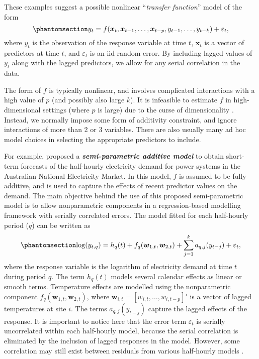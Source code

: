 \documentclass[
  11pt,
  a4paper,
]{article}
\begin{document}
These examples suggest a possible nonlinear ``\emph{transfer function}''
model of the form \begin{equation}\phantomsection\label{eq-transferfun}{
 y_t = f(\bm{x}_{t}, \bm{x}_{t-1}, \dots,\bm{x}_{t-p}, y_{t-1},\dots,y_{t-k}) + \varepsilon_{t},
}\end{equation} where \(y_{t}\) is the observation of the response
variable at time \(t\), \(\bm{x}_{t}\) is a vector of predictors at time
\(t\), and \(\varepsilon_{t}\) is an iid random error. By including
lagged values of \(y_{t}\) along with the lagged predictors, we allow
for any serial correlation in the data.

The form of \(f\) is typically nonlinear, and involves complicated
interactions with a high value of \(p\) (and possibly also large \(k\)).
It is infeasible to estimate \(f\) in high-dimensional settings (where
\(p\) is large) due to the curse of dimensionality
\autocite{Bellman57,Stone82}. Instead, we normally impose some form of
additivity constraint, and ignore interactions of more than 2 or 3
variables. There are also usually many ad hoc model choices in selecting
the appropriate predictors to include.

For example, \textcite{FH2012} proposed a \textbf{\emph{semi-parametric
additive model}} to obtain short-term forecasts of the half-hourly
electricity demand for power systems in the Australian National
Electricity Market. In this model, \(f\) is assumed to be fully
additive, and is used to capture the effects of recent predictor values
on the demand. The main objective behind the use of this proposed
semi-parametric model is to allow nonparametric components in a
regression-based modelling framework with serially correlated errors.
The model fitted for each half-hourly period (\(q\)) can be written as
\begin{equation}\phantomsection\label{eq-FH}{
 \log(y_{t,q}) = h_{q}(t) + f_{q}(\bm{w}_{1,t},\bm{w}_{2,t}) + \sum_{j=1}^k a_{q,j}(y_{t-j}) + \varepsilon_{t},
}\end{equation} where the response variable is the logarithm of
electricity demand at time \(t\) during period \(q\). The term
\(h_{q}(t)\) models several calendar effects as linear or smooth terms.
Temperature effects are modelled using the nonparametric component
\(f_{q}(\bm{w}_{1,t},\bm{w}_{2,t})\), where
\(\bm{w}_{i,t} = [w_{i,t},\dots,w_{i,t-p}]'\) is a vector of lagged
temperatures at site \(i\). The terms \(a_{q,j}(y_{t-j})\) capture the
lagged effects of the response. It is important to notice here that the
error term \(\varepsilon_{t}\) is serially uncorrelated within each
half-hourly model, because the serial correlation is eliminated by the
inclusion of lagged responses in the model. However, some correlation
may still exist between residuals from various half-hourly models
\autocite{FH2012}.
\end{document}
